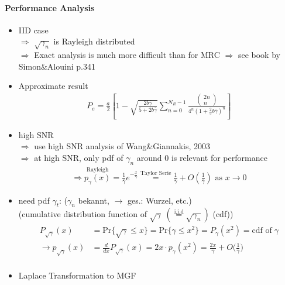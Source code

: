 \documentclass[a4paper, 10pt]{article}
\begin{document}
\paragraph*{Performance Analysis}
\begin{itemize}
	\item IID case \\
	$\Rightarrow$ $\sqrt{\gamma_n}$ is Rayleigh distributed\\
	$\Rightarrow$ Exact analysis is much more difficult than for MRC $\Rightarrow$ see book by Simon\;\&\;Alouini p.341
	\item Approximate result
\begin{align*}
	P_e=\frac{a}{2}\left[1-\sqrt{\frac{2b\bar{\gamma}}{5+2b\bar{\gamma}}}\sum\limits_{n=0}^{N_R-1}\frac{\left(\! \begin{array}{c} 2n \\ n \end{array} \!\right) }{4^n(1+\frac{2}{5}b\bar{\gamma})^n}\right]
\end{align*}
	\item high SNR\\
	$\Rightarrow$ use high SNR analysis of Wang\;\&\;Giannakis, 2003\\
	$\Rightarrow$ at high SNR, only pdf of $\gamma_n$ around $0$ is relevant for performance
\begin{align*}
	\Rightarrow \overset{\text{Rayleigh}}{p_\gamma(x)} = \frac{1}{\bar{\gamma}}e^{-\frac{x}{\bar{\gamma}}}\overset{\text{Taylor Serie}}{=}\frac{1}{\bar{\gamma}}+O\left(\frac{1}{\bar{\gamma}}\right)\text{ as } x \to 0
\end{align*}
	\item need pdf $\gamma _t$: ($\gamma _n$ bekannt, $\rightarrow$ ges.: Wurzel, etc.)\\ (cumulative distribution function of $\sqrt{\gamma}\;(\overset{\text{i.i.d}}{=}\sqrt{\gamma_n}) $ (cdf))
	\begin{align*}
		P_{\sqrt{\gamma}}(x) &= \text{Pr}\bigl\{\sqrt{\gamma}\leq x \bigr\} = \text{Pr}\bigl\{\gamma\leq x^2 \bigr\} = P_{\gamma}(x^2) = \text{cdf of}\;\gamma\\
		\rightarrow p_{\sqrt{\gamma}}(x) &= \frac{d}{dx}P_{\sqrt{\gamma}}(x) = 2x\cdot p_{\gamma}(x^2) = \frac{2x}{\bar{\gamma}} + O\bigl(\frac{1}{\bar{\gamma}}\bigr)\\
	\end{align*}
	\item Laplace Transformation to MGF
	\begin{align*}

\end{align*}
\end{itemize}
\end{document}
